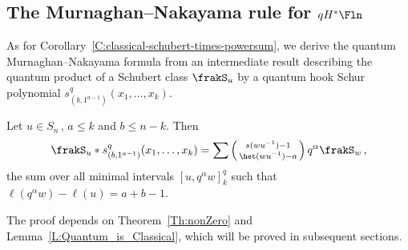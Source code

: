 \subsection{The Murnaghan--Nakayama rule for \texorpdfstring{$qH^*\Fln$}{qH*Fln}}

As for Corollary~\ref{C:classical-schubert-times-powersum},
we derive the quantum Murnaghan--Nakayama formula from an intermediate result
describing the quantum product of a Schubert class $\frakS_u$ by a quantum hook Schur
polynomial $s_{(b, 1^{a-1})}^q(x_1,\dotsc,x_k)$.

\begin{theorem}
    \label{thm:q_hook_product}
    Let $u \in S_n$\,, $a \leq k$ and $b \leq n-k$. Then
    \begin{equation*}
        \frakS_u
        \ast
        s^q_{(b,1^{a-1})} (x_1, \dots, x_k)
        = \sum
        \left(\begin{smallmatrix} s(wu^{-1})-1 \\ \het(wu^{-1})-a \end{smallmatrix}\right)
        q^\alpha
        \frakS_{w}\,,
    \end{equation*}
    the sum over all minimal intervals $[u,  q^{\alpha}w]_k^q$ such that $\ell(q^\alpha w) - \ell(u)= a{+}b{-}1$.
\end{theorem}

The proof depends on  Theorem~\ref{Th:nonZero} and Lemma~\ref{L:Quantum_is_Classical}, which will be proved in
subsequent sections.

